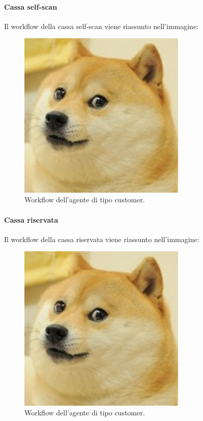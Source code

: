 \paragraph{Cassa self-scan}

Il workflow della cassa self-scan viene riassunto nell'immagine:

\begin{figure}[htp!]
	\centering
	\hspace*{3cm}
	\includegraphics[width=8cm]{"images/doggo.jpg"}
	\caption{Workflow dell'agente di tipo customer.}
	\label{fig:workflow_customer}
\end{figure}

\paragraph{Cassa riservata}

Il workflow della cassa riservata viene riassunto nell'immagine:

\begin{figure}[htp!]
	\centering
	\hspace*{3cm}
	\includegraphics[width=8cm]{"images/doggo.jpg"}
	\caption{Workflow dell'agente di tipo customer.}
	\label{fig:workflow_customer}
\end{figure}

